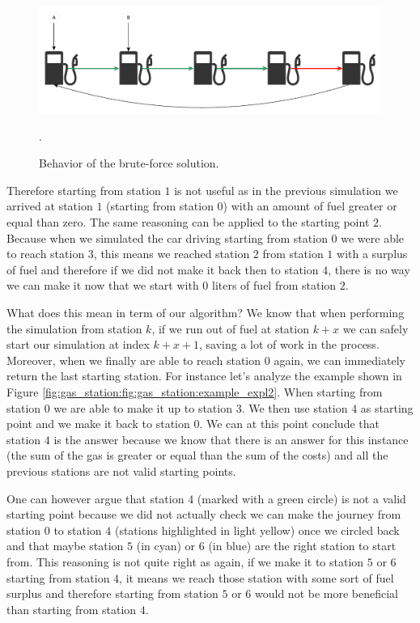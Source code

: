 \begin{figure}
	\centering
	\includegraphics[width=\textwidth]{sources/gas_station/images/example_expl1}
	\caption[]{Behavior of the brute-force solution.}.
	\label{fig:gas_station:fig:gas_station:example_expl1}
\end{figure}

Therefore starting from station $1$ is not useful as in the previous simulation we arrived at station $1$ (starting from station $0$) with an amount of fuel greater or equal than zero. The same reasoning can be applied to the starting point $2$. Because when we simulated the car driving starting from station $0$ we were able to reach station $3$, this means we reached station $2$ from station $1$ with a surplus of fuel and therefore if we did not make it back then to station $4$, there is no way we can make it now that we start with $0$ liters of fuel from station $2$.

What does this mean in term of our algorithm? We know that when performing the simulation from station $k$, if we run out of fuel at station $k+x$ we can safely start our simulation at index $k+x+1$, saving a lot of work in the process. 
Moreover, when we finally are able to reach station $0$ again, we can immediately return the last starting station. 
For instance let's analyze the example shown in Figure \ref{fig:gas_station:fig:gas_station:example_expl2}. When starting from station $0$ we are able to make it up to station $3$. We then use station $4$ as starting point and we make it back to station $0$. We can at this point conclude that station $4$ is the answer because we know that there is an answer for this instance (the sum of the gas is greater or equal than the sum of the costs) and all the previous stations are not valid starting points. 

One can however argue that station $4$ (marked with a green circle) is not a valid starting point because we did not actually check we can make the journey from station $0$ to station $4$ (stations highlighted in light yellow) once we circled back and that maybe station $5$ (in cyan) or $6$ (in blue) are the right station to start from.
This reasoning is not quite right as again, if we make it to station $5$ or $6$ starting from station $4$, it means we reach those station with some sort of fuel surplus and therefore starting from station $5$ or $6$ would not be more beneficial than starting from station $4$.

